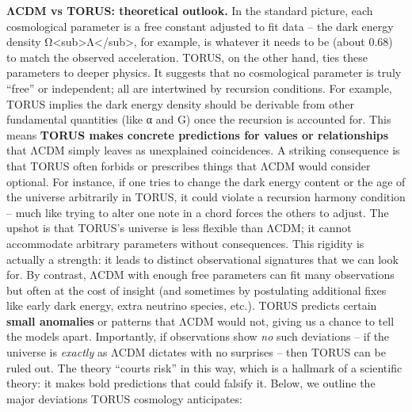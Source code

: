 \textbf{ΛCDM vs TORUS: theoretical outlook.} In the standard picture,
each cosmological parameter is a free constant adjusted to fit data --
the dark energy density
Ω\textless{}sub\textgreater{}Λ\textless{}/sub\textgreater{}, for
example, is whatever it needs to be (about 0.68) to match the observed
acceleration. TORUS, on the other hand, ties these parameters to deeper
physics. It suggests that no cosmological parameter is truly ``free'' or
independent; all are intertwined by recursion conditions. For example,
TORUS implies the dark energy density should be derivable from other
fundamental quantities (like α and G) once the recursion is accounted
for​. This means \textbf{TORUS makes concrete predictions for values or
relationships} that ΛCDM simply leaves as unexplained coincidences. A
striking consequence is that TORUS often forbids or prescribes things
that ΛCDM would consider optional. For instance, if one tries to change
the dark energy content or the age of the universe arbitrarily in TORUS,
it could violate a recursion harmony condition -- much like trying to
alter one note in a chord forces the others to adjust. The upshot is
that TORUS's universe is less flexible than ΛCDM; it cannot accommodate
arbitrary parameters without consequences. This rigidity is actually a
strength: it leads to distinct observational signatures that we can look
for. By contrast, ΛCDM with enough free parameters can fit many
observations but often at the cost of insight (and sometimes by
postulating additional fixes like early dark energy, extra neutrino
species, etc.). TORUS predicts certain \textbf{small anomalies} or
patterns that ΛCDM would not, giving us a chance to tell the models
apart. Importantly, if observations show \emph{no} such deviations -- if
the universe is \emph{exactly} as ΛCDM dictates with no surprises --
then TORUS can be ruled out. The theory ``courts risk'' in this way​,
which is a hallmark of a scientific theory: it makes bold predictions
that could falsify it. Below, we outline the major deviations TORUS
cosmology anticipates:

